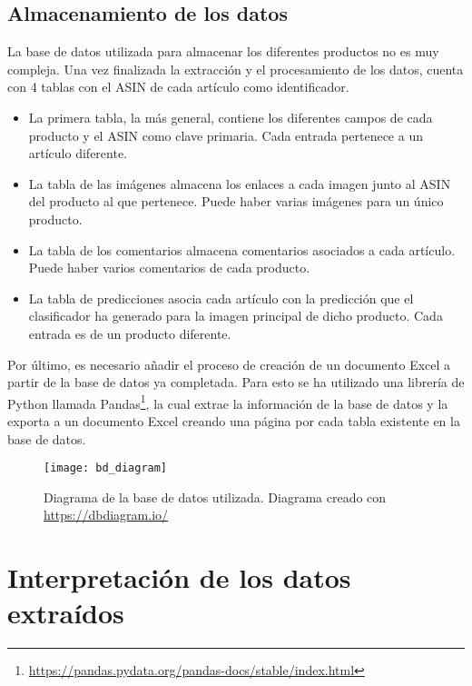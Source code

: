 \subsection{Almacenamiento de los datos}

La base de datos utilizada para almacenar los diferentes productos no es muy compleja. Una vez finalizada la extracción y el procesamiento de los datos, cuenta con 4 tablas con el ASIN de cada artículo como identificador.

\begin{itemize}
    \item La primera tabla, la más general, contiene los diferentes campos de cada producto y el ASIN como clave primaria. Cada entrada pertenece a un artículo diferente.
    \item La tabla de las imágenes almacena los enlaces a cada imagen junto al ASIN del producto al que pertenece. Puede haber varias imágenes para un único producto.
    \item La tabla de los comentarios almacena comentarios asociados a cada artículo. Puede haber varios comentarios de cada producto.
    \item La tabla de predicciones asocia cada artículo con la predicción que el clasificador ha generado para la imagen principal de dicho producto. Cada entrada es de un producto diferente.
\end{itemize}

Por último, es necesario añadir el proceso de creación de un documento Excel a partir de la base de datos ya completada. Para esto se ha utilizado una librería de Python llamada Pandas\footnote{\url{https://pandas.pydata.org/pandas-docs/stable/index.html}}, la cual extrae la información de la base de datos y la exporta a un documento Excel creando una página por cada tabla existente en la base de datos.
\newline

\FloatBarrier
    \begin{figure}[!h]
    \centering
    \texttt{[image: bd\_diagram]}
    \caption[Diagrama de la base de datos utilizada]{Diagrama de la base de datos utilizada. Diagrama creado con \url{https://dbdiagram.io/}}
    \label{fig}
    \end{figure}
\FloatBarrier

\newpage

\section{Interpretación de los datos extraídos}

